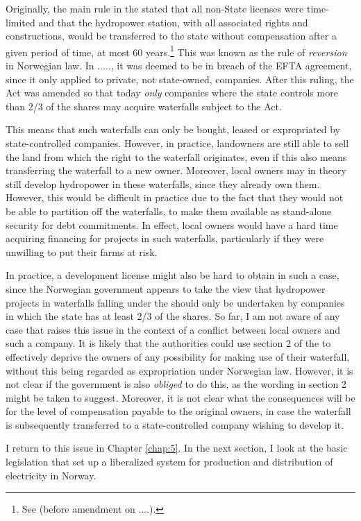 Originally, the main rule in the \cite{ica17} stated that all non-State licenses were time-limited and that the hydropower station, with all associated rights and constructions, would be transferred to the state without compensation after a given period of time, at most 60 years.\footnote{See \cite[2]{ica17} (before amendment on ....).} This was known as the rule of {\it reversion} in Norwegian law. In ....., it was deemed to be in breach of the EFTA agreement, since it only applied to private, not state-owned, companies.  After this ruling, the Act was amended so that today {\it only} companies where the state controls more than 2/3 of the shares may acquire waterfalls subject to the Act.

This means that such waterfalls can only be bought, leased or expropriated by state-controlled companies. However, in practice, landowners are still able to sell the land from which the right to the waterfall originates, even if this also means transferring the waterfall to a new owner.  Moreover, local owners may in theory still develop hydropower in these waterfalls, since they already own them. However, this would be difficult in practice due to the fact that they would not be able to partition off the waterfalls, to make them available as stand-alone security for debt commitments. In effect, local owners would have a hard time acquiring financing for projects in such waterfalls, particularly if they were unwilling to put their farms at risk. 

In practice, a development license might also be hard to obtain in such a case, since the Norwegian government appears to take the view that hydropower projects in waterfalls falling under the \cite{ica17} should only be undertaken by companies in which the state has at least 2/3 of the shares. So far, I am not aware of any case that raises this issue in the context of a conflict between local owners and such a company. It is likely that the authorities could use section 2 of the \cite{ica17} to effectively deprive the owners of any possibility for making use of their waterfall, without this being regarded as expropriation under Norwegian law. However, it is not clear if the government is also {\it obliged} to do this, as the wording in section 2 might be taken to suggest. Moreover, it is not clear what the consequences will be for the level of compensation payable to the original owners, in case the waterfall is subsequently transferred to a state-controlled company wishing to develop it. 

I return to this issue in Chapter \ref{chap:5}. In the next section, I look at the basic legislation that set up a liberalized system for production and distribution of electricity in Norway.

